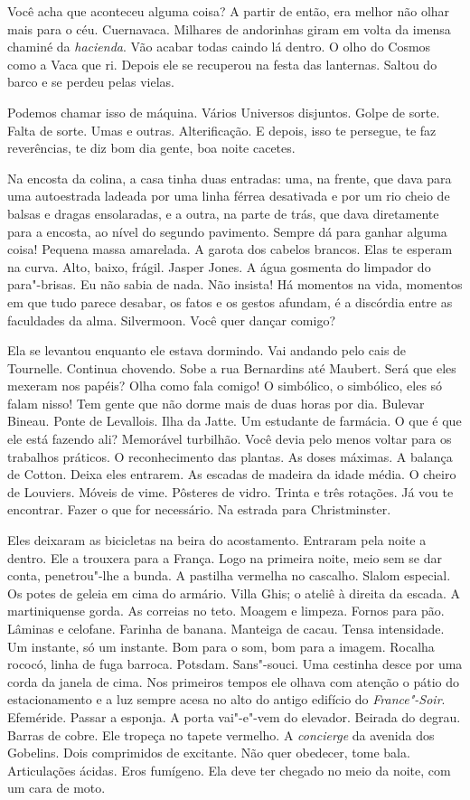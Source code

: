 Você acha que aconteceu alguma coisa? A partir de então, era melhor não
olhar mais para o céu. Cuernavaca. Milhares de andorinhas giram em volta
da imensa chaminé da \emph{hacienda}. Vão acabar todas caindo lá dentro.
O olho do Cosmos como a Vaca que ri. Depois ele se recuperou na festa
das lanternas. Saltou do barco e se perdeu pelas vielas.

Podemos chamar isso de máquina. Vários Universos disjuntos. Golpe de
sorte. Falta de sorte. Umas e outras. Alterificação. E depois, isso te
persegue, te faz reverências, te diz bom dia gente, boa noite cacetes.

Na encosta da colina, a casa tinha duas entradas: uma, na frente, que
dava para uma autoestrada ladeada por uma linha férrea desativada e por
um rio cheio de balsas e dragas ensolaradas, e a outra, na parte de
trás, que dava diretamente para a encosta, ao nível do segundo
pavimento. Sempre dá para ganhar alguma coisa! Pequena massa amarelada.
A garota dos cabelos brancos. Elas te esperam na curva. Alto, baixo,
frágil. Jasper Jones. A água gosmenta do limpador do para"-brisas. Eu não
sabia de nada. Não insista! Há momentos na vida, momentos em que tudo
parece desabar, os fatos e os gestos afundam, é a discórdia entre as
faculdades da alma. Silvermoon. Você quer dançar comigo?

Ela se levantou enquanto ele estava dormindo. Vai andando pelo cais de
Tournelle. Continua chovendo. Sobe a rua Bernardins até Maubert. Será
que eles mexeram nos papéis? Olha como fala comigo! O simbólico, o
simbólico, eles só falam nisso! Tem gente que não dorme mais de duas
horas por dia. Bulevar Bineau. Ponte de Levallois. Ilha da Jatte. Um
estudante de farmácia. O que é que ele está fazendo ali? Memorável
turbilhão. Você devia pelo menos voltar para os trabalhos práticos. O
reconhecimento das plantas. As doses máximas. A balança de Cotton. Deixa
eles entrarem. As escadas de madeira da idade média. O cheiro de %
Louviers. Móveis de vime. Pôsteres de vidro. Trinta e três rotações. Já
vou te encontrar. Fazer o que for necessário. Na estrada para
Christminster.

Eles deixaram as bicicletas na beira do acostamento. Entraram pela noite
a dentro. Ele a trouxera para a França. Logo na primeira noite, meio sem %
se dar conta, penetrou"-lhe a bunda. A pastilha vermelha no cascalho.
Slalom especial. Os potes de geleia em cima do armário. Villa Ghis; o
ateliê à direita da escada. A martiniquense gorda. As correias no teto.
Moagem e limpeza. Fornos para pão. Lâminas e celofane. Farinha de
banana. Manteiga de cacau. Tensa intensidade. Um instante, só um
instante. Bom para o som, bom para a imagem. Rocalha rococó, linha de
fuga barroca. Potsdam. Sans"-souci. Uma cestinha desce por uma corda da
janela de cima. Nos primeiros tempos ele olhava com atenção o pátio do
estacionamento e a luz sempre acesa no alto do antigo edifício do
\emph{France"-Soir}. Efeméride. Passar a esponja. A porta vai"-e"-vem do
elevador. Beirada do degrau. Barras de cobre. Ele tropeça no tapete
vermelho. A \emph{concierge} da avenida dos Gobelins. Dois comprimidos
de excitante. Não quer obedecer, tome bala. Articulações ácidas. Eros
fumígeno. Ela deve ter chegado no meio da noite, com um cara de moto.

